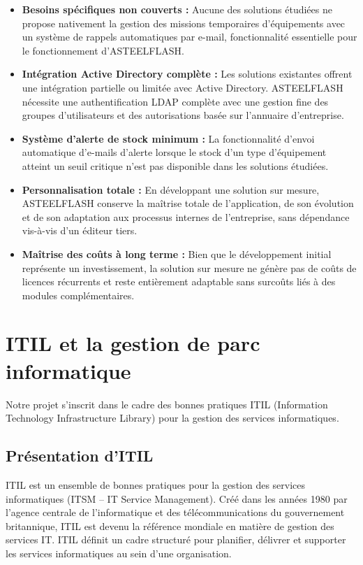 \begin{itemize}[label=\textbullet,font=\normalsize]
    \item \textbf{Besoins spécifiques non couverts :} Aucune des solutions étudiées ne propose nativement la gestion des missions temporaires d'équipements avec un système de rappels automatiques par e-mail, fonctionnalité essentielle pour le fonctionnement d'ASTEELFLASH.
    \item \textbf{Intégration Active Directory complète :} Les solutions existantes offrent une intégration partielle ou limitée avec Active Directory. ASTEELFLASH nécessite une authentification LDAP complète avec une gestion fine des groupes d'utilisateurs et des autorisations basée sur l'annuaire d'entreprise.
    \item \textbf{Système d'alerte de stock minimum :} La fonctionnalité d'envoi automatique d'e-mails d'alerte lorsque le stock d'un type d'équipement atteint un seuil critique n'est pas disponible dans les solutions étudiées.
    \item \textbf{Personnalisation totale :} En développant une solution sur mesure, ASTEELFLASH conserve la maîtrise totale de l'application, de son évolution et de son adaptation aux processus internes de l'entreprise, sans dépendance vis-à-vis d'un éditeur tiers.
    \item \textbf{Maîtrise des coûts à long terme :} Bien que le développement initial représente un investissement, la solution sur mesure ne génère pas de coûts de licences récurrents et reste entièrement adaptable sans surcoûts liés à des modules complémentaires.
\end{itemize}

\section{ITIL et la gestion de parc informatique}

Notre projet s'inscrit dans le cadre des bonnes pratiques ITIL (Information Technology Infrastructure Library) pour la gestion des services informatiques.

\subsection{Présentation d'ITIL}

ITIL est un ensemble de bonnes pratiques pour la gestion des services informatiques (ITSM -- IT Service Management). Créé dans les années 1980 par l'agence centrale de l'informatique et des télécommunications du gouvernement britannique, ITIL est devenu la référence mondiale en matière de gestion des services IT. ITIL définit un cadre structuré pour planifier, délivrer et supporter les services informatiques au sein d'une organisation.

